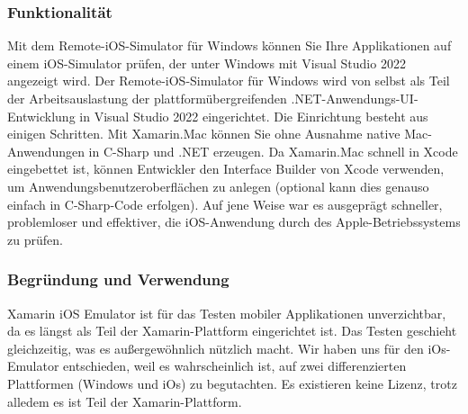 \subsubsection*{Funktionalität}
Mit dem Remote-iOS-Simulator für Windows können Sie Ihre 
Applikationen auf einem iOS-Simulator prüfen, der unter Windows mit 
Visual Studio 2022 angezeigt wird.
Der Remote-iOS-Simulator für Windows wird von selbst als Teil der 
Arbeitsauslastung der plattformübergreifenden .NET-Anwendungs-UI-Entwicklung 
in Visual Studio 2022 eingerichtet. Die Einrichtung besteht aus einigen Schritten.
Mit Xamarin.Mac können Sie ohne Ausnahme native Mac-Anwendungen in C-Sharp und .NET 
erzeugen. Da Xamarin.Mac schnell in Xcode eingebettet ist, können 
Entwickler den Interface Builder von Xcode verwenden, um Anwendungsbenutzeroberflächen 
zu anlegen (optional kann dies genauso einfach in C-Sharp-Code erfolgen). 
Auf jene Weise war es ausgeprägt schneller, problemloser und effektiver, 
die iOS-Anwendung durch des Apple-Betriebssystems zu prüfen.
\subsubsection*{Begründung und Verwendung}
Xamarin iOS Emulator ist für das Testen mobiler Applikationen unverzichtbar, 
da es längst als Teil der Xamarin-Plattform eingerichtet ist. Das Testen 
geschieht gleichzeitig, was es außergewöhnlich nützlich macht. 
Wir haben uns für den iOs-Emulator entschieden, weil es wahrscheinlich 
ist, auf zwei differenzierten Plattformen (Windows und iOs) zu 
begutachten. Es existieren keine Lizenz, trotz alledem es ist Teil der Xamarin-Plattform.
\newpage